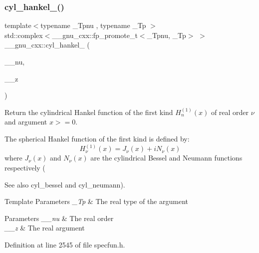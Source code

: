 \subsubsection{\texorpdfstring{cyl\+\_\+hankel\+\_()}{cyl\_hankel\_1()}\hspace{0.1cm}{\footnotesize\ttfamily [1/2]}}
{\footnotesize\ttfamily template$<$typename \+\_\+\+Tpnu , typename \+\_\+\+Tp $>$ \\
std\+::complex$<$\+\_\+\+\_\+gnu\+\_\+cxx\+::fp\+\_\+promote\+\_\+t$<$\+\_\+\+Tpnu, \+\_\+\+Tp$>$ $>$ \+\_\+\+\_\+gnu\+\_\+cxx\+::cyl\+\_\+hankel\+\_ (\begin{DoxyParamCaption}\item[{\+\_\+\+Tpnu}]{\+\_\+\+\_\+nu,  }\item[{\+\_\+\+Tp}]{\+\_\+\+\_\+z }\end{DoxyParamCaption})\hspace{0.3cm}{\ttfamily [inline]}}

Return the cylindrical Hankel function of the first kind $ H^{(1)}_n(x) $ of real order $ \nu $ and argument $ x >= 0 $.

The spherical Hankel function of the first kind is defined by\+: \[ H^{(1)}_\nu(x) = J_\nu(x) + iN_\nu(x) \] where $ J_\nu(x) $ and $ N_\nu(x) $ are the cylindrical Bessel and Neumann functions respectively (\begin{DoxySeeAlso}{See also}
cyl\+\_\+bessel and cyl\+\_\+neumann).
\end{DoxySeeAlso}

\begin{DoxyTemplParams}{Template Parameters}
{\em \+\_\+\+Tp} & The real type of the argument \\
\hline
\end{DoxyTemplParams}

\begin{DoxyParams}{Parameters}
{\em \+\_\+\+\_\+nu} & The real order \\
\hline
{\em \+\_\+\+\_\+z} & The real argument \\
\hline
\end{DoxyParams}


Definition at line 2545 of file specfun.\+h.

\mbox{\label{group__gnu__math__spec__func_ga2f111212d3ec713625acb6986daa925f}} 
